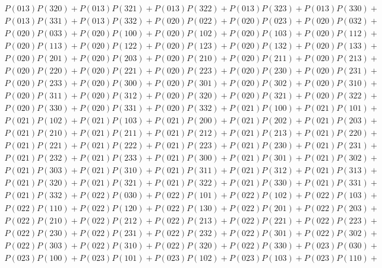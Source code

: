 \documentclass{article}
\theoremstyle{definition}
\begin{document}
\begin{gather*}
        P(013)P(320) + P(013)P(321) + P(013)P(322) + P(013)P(323) + P(013)P(330) +\\
        P(013)P(331) + P(013)P(332) + P(020)P(022) + P(020)P(023) + P(020)P(032) +\\
        P(020)P(033) + P(020)P(100) + P(020)P(102) + P(020)P(103) + P(020)P(112) +\\
        P(020)P(113) + P(020)P(122) + P(020)P(123) + P(020)P(132) + P(020)P(133) +\\
        P(020)P(201) + P(020)P(203) + P(020)P(210) + P(020)P(211) + P(020)P(213) +\\
        P(020)P(220) + P(020)P(221) + P(020)P(223) + P(020)P(230) + P(020)P(231) +\\
        P(020)P(233) + P(020)P(300) + P(020)P(301) + P(020)P(302) + P(020)P(310) +\\
        P(020)P(311) + P(020)P(312) + P(020)P(320) + P(020)P(321) + P(020)P(322) +\\
        P(020)P(330) + P(020)P(331) + P(020)P(332) + P(021)P(100) + P(021)P(101) +\\
        P(021)P(102) + P(021)P(103) + P(021)P(200) + P(021)P(202) + P(021)P(203) +\\
        P(021)P(210) + P(021)P(211) + P(021)P(212) + P(021)P(213) + P(021)P(220) +\\
        P(021)P(221) + P(021)P(222) + P(021)P(223) + P(021)P(230) + P(021)P(231) +\\
        P(021)P(232) + P(021)P(233) + P(021)P(300) + P(021)P(301) + P(021)P(302) +\\
        P(021)P(303) + P(021)P(310) + P(021)P(311) + P(021)P(312) + P(021)P(313) +\\
        P(021)P(320) + P(021)P(321) + P(021)P(322) + P(021)P(330) + P(021)P(331) +\\
        P(021)P(332) + P(022)P(030) + P(022)P(101) + P(022)P(102) + P(022)P(103) +\\
        P(022)P(110) + P(022)P(120) + P(022)P(130) + P(022)P(201) + P(022)P(203) +\\
        P(022)P(210) + P(022)P(212) + P(022)P(213) + P(022)P(221) + P(022)P(223) +\\
        P(022)P(230) + P(022)P(231) + P(022)P(232) + P(022)P(301) + P(022)P(302) +\\
        P(022)P(303) + P(022)P(310) + P(022)P(320) + P(022)P(330) + P(023)P(030) +\\
        P(023)P(100) + P(023)P(101) + P(023)P(102) + P(023)P(103) + P(023)P(110) +\\

\end{gather*}
\end{document}
